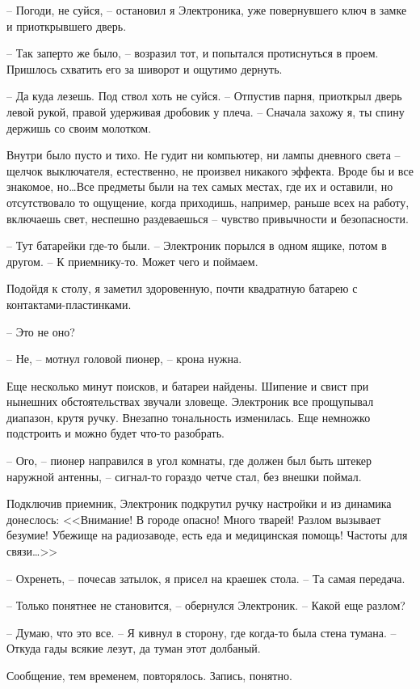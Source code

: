 \documentclass[a4paper]{book}
\begin{document}
-- Погоди, не суйся, -- остановил я Электроника, уже повернувшего ключ в замке и приоткрывшего дверь.

-- Так заперто же было, -- возразил тот, и попытался протиснуться в проем. Пришлось схватить его за шиворот и ощутимо дернуть.

-- Да куда лезешь. Под ствол хоть не суйся. -- Отпустив парня, приоткрыл дверь левой рукой, правой удерживая дробовик у плеча. -- Сначала захожу я, ты спину держишь со своим молотком.

Внутри было пусто и тихо. Не гудит ни компьютер, ни лампы дневного света -- щелчок выключателя, естественно, не произвел никакого эффекта. Вроде бы и все знакомое, но\ldots  Все предметы были на тех самых местах, где их и оставили, но отсутствовало то ощущение, когда приходишь, например, раньше всех на работу, включаешь свет, неспешно раздеваешься -- чувство привычности и безопасности. 

-- Тут батарейки где-то были. -- Электроник порылся в одном ящике, потом в другом. -- К приемнику-то. Может чего и поймаем.

Подойдя к столу, я заметил здоровенную, почти квадратную батарею с контактами-пластинками. 

-- Это не оно?

-- Не, -- мотнул головой пионер, -- крона нужна.

Еще несколько минут поисков, и батареи найдены. Шипение и свист при нынешних обстоятельствах звучали зловеще. Электроник все прощупывал диапазон, крутя ручку. Внезапно тональность изменилась. Еще немножко подстроить и можно будет что-то разобрать.

-- Ого, -- пионер направился в угол комнаты, где должен был быть штекер наружной антенны, -- сигнал-то гораздо четче стал, без внешки поймал. 

Подключив приемник, Электроник подкрутил ручку настройки и из динамика донеслось: <<Внимание! В городе опасно! Много тварей! Разлом вызывает безумие! Убежище на радиозаводе, есть еда и медицинская помощь! Частоты для связи\ldots >>

-- Охренеть, -- почесав затылок, я присел на краешек стола. -- Та самая передача. 

-- Только понятнее не становится, -- обернулся Электроник. -- Какой еще разлом?

-- Думаю, что это все. -- Я кивнул в сторону, где когда-то была стена тумана. -- Откуда гады всякие лезут, да туман этот долбаный.

Сообщение, тем временем, повторялось. Запись, понятно. 
\end{document}
